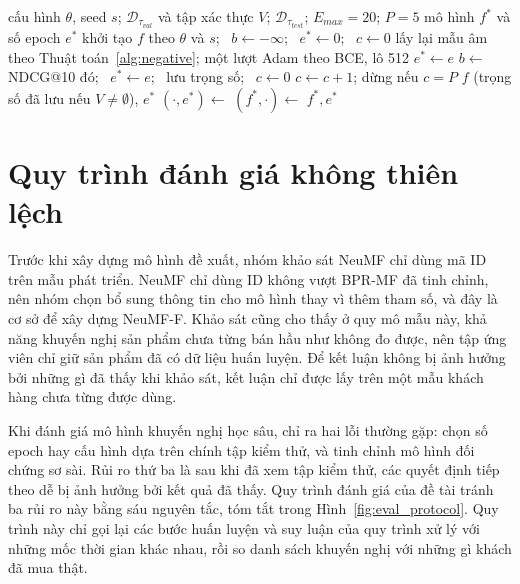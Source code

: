 \begin{algorithm}[H]
\caption{Huấn luyện có dừng sớm và huấn luyện lại đúng số epoch}
\label{alg:train}
\begin{algorithmic}[1]
\Require cấu hình $\theta$, seed $s$; $\mathcal{D}_{\tau_{val}}$ và tập xác thực $V$; $\mathcal{D}_{\tau_{test}}$; $E_{max} = 20$; $P = 5$
\Ensure mô hình $f^*$ và số epoch $e^*$
    \State khởi tạo $f$ theo $\theta$ và $s$; \ $b \gets -\infty$; \ $e^* \gets 0$; \ $c \gets 0$
        \State lấy lại mẫu âm theo Thuật toán~\ref{alg:negative}; một lượt Adam theo BCE, lô 512
         
            \State $e^* \gets e$
            \State $b \gets$ NDCG@10 đó; \ $e^* \gets e$; \ lưu trọng số; \ $c \gets 0$
        \Else
            \State $c \gets c + 1$; dừng nếu $c = P$
        \EndIf
    \EndFor
    \State \Return $f$ (trọng số đã lưu nếu $V \neq \emptyset$), $e^*$
\EndFunction
\State $(\cdot, e^*) \gets$  
\State $(f^*, \cdot) \gets$  
\State \Return $f^*, e^*$
\end{algorithmic}
\end{algorithm}

\section{Quy trình đánh giá không thiên lệch}
\label{sec:protocol}

Trước khi xây dựng mô hình đề xuất, nhóm khảo sát NeuMF chỉ dùng mã ID trên mẫu phát triển. NeuMF chỉ dùng ID không vượt BPR-MF đã tinh chỉnh, nên nhóm chọn bổ sung thông tin cho mô hình thay vì thêm tham số, và đây là cơ sở để xây dựng NeuMF-F. Khảo sát cũng cho thấy ở quy mô mẫu này, khả năng khuyến nghị sản phẩm chưa từng bán hầu như không đo được, nên tập ứng viên chỉ giữ sản phẩm đã có dữ liệu huấn luyện. Để kết luận không bị ảnh hưởng bởi những gì đã thấy khi khảo sát, kết luận chỉ được lấy trên một mẫu khách hàng chưa từng được dùng.


Khi đánh giá mô hình khuyến nghị học sâu, \textcite{dacrema2019progress} chỉ ra hai lỗi thường gặp: chọn số epoch hay cấu hình dựa trên chính tập kiểm thử, và tinh chỉnh mô hình đối chứng sơ sài. Rủi ro thứ ba là sau khi đã xem tập kiểm thử, các quyết định tiếp theo dễ bị ảnh hưởng bởi kết quả đã thấy. Quy trình đánh giá của đề tài tránh ba rủi ro này bằng sáu nguyên tắc, tóm tắt trong Hình~\ref{fig:eval_protocol}. Quy trình này chỉ gọi lại các bước huấn luyện và suy luận của quy trình xử lý với những mốc thời gian khác nhau, rồi so danh sách khuyến nghị với những gì khách đã mua thật.

